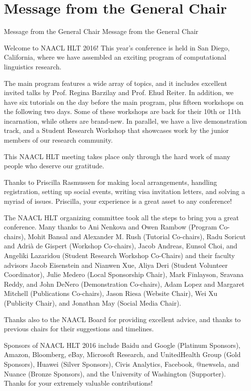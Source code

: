 \section{Message from the General Chair}\vspace{2em}
\setheaders%
    {Message from the General Chair}%
    {Message from the General Chair}
\thispagestyle{emptyheader}

\setlength{\parskip}{1ex}

Welcome to NAACL HLT 2016!  This year's conference is held in San Diego,
California, where we have assembled an exciting program of computational
linguistics research.

The main program features a wide array of topics, and it includes
excellent invited talks by Prof. Regina Barzilay and Prof. Ehud Reiter.
In addition, we have six tutorials on the day before the main program,
plus fifteen workshops on the following two days. Some of these
workshops are back for their 10th or 11th incarnation, while others are
brand-new.  In parallel, we have a live demonstration track, and a
Student Research Workshop that showcases work by the junior members of
our research community.

This NAACL HLT meeting takes place only through the hard work of many
people who deserve our gratitude.

Thanks to Priscilla Rasmussen for making local arrangements, handling
registration, setting up social events, writing visa invitation letters,
and solving a myriad of issues.  Priscilla, your experience is a great
asset to any conference!

The NAACL HLT organizing committee took all the steps to bring you a
great conference.  Many thanks to Ani Nenkova and Owen Rambow (Program
Co-chairs), Mohit Bansal and Alexander M. Rush (Tutorial Co-chairs),
Radu Soricut and Adrià de Gispert (Workshop Co-chairs), Jacob Andreas,
Eunsol Choi, and Angeliki Lazaridou (Student Research Workshop
Co-Chairs) and their faculty advisors Jacob Eisenstein and Nianwen Xue,
Aliya Deri (Student Volunteer Coordinator), Julie Medero (Local
Sponsorship Chair), Mark Finlayson, Sravana Reddy, and John DeNero
(Demonstration Co-chairs), Adam Lopez and Margaret Mitchell
(Publications Co-chairs), Jason Riesa (Website Chair), Wei Xu (Publicity
Chair), and Jonathan May (Social Media Chair).

Thanks also to the NAACL Board for providing excellent advice, and
thanks to previous chairs for their suggestions and timelines.

Sponsors of NAACL HLT 2016 include Baidu and Google (Platinum Sponsors),
Amazon, Bloomberg, eBay, Microsoft Research, and UnitedHealth Group
(Gold Sponsors), Huawei (Silver Sponsors), Civis Analytics, Facebook,
@newsela, and Nuance (Bronze Sponsors), and the University of Washington
(Supporter).  Thanks for your extremely valuable contributions!

